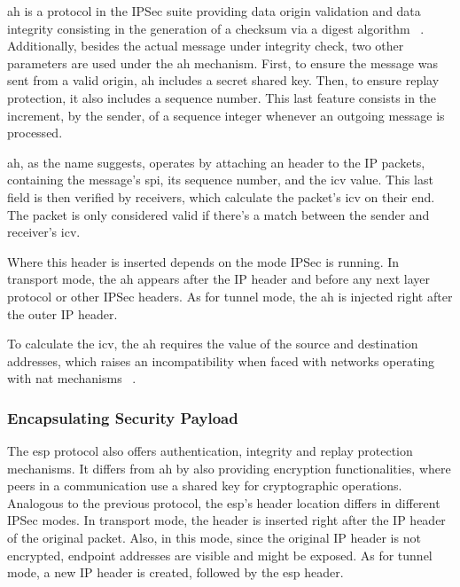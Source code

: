 \documentclass[11pt,twoside,a4paper]{report}
\begin{document}
\acrfull{ah} is a protocol in the IPSec suite providing data origin validation and data integrity consisting in the generation of a checksum via a digest algorithm ~\cite{rfc4302}. Additionally, besides the actual message under integrity check, two other parameters are used under the \acrshort{ah} mechanism. First, to ensure the message was sent from a valid origin, \acrshort{ah} includes a secret shared key. Then, to ensure replay protection, it also includes a sequence number. This last feature consists in the increment, by the sender, of a sequence integer whenever an outgoing message is processed.

\acrshort{ah}, as the name suggests, operates by attaching an header to the IP packets, containing the message's \acrshort{spi}, its sequence number, and the \acrfull{icv} value. This last field is then verified by receivers, which calculate the packet's \acrshort{icv} on their end. The packet is only considered valid if there's a match between the sender and receiver's \acrshort{icv}.

Where this header is inserted depends on the mode IPSec is running. In transport mode, the \acrshort{ah} appears after the IP header and before any next layer protocol or other IPSec headers. As for tunnel mode, the \acrshort{ah} is injected right after the outer IP header.

To calculate the \acrshort{icv}, the \acrshort{ah} requires the value of the source and destination addresses, which raises an incompatibility when faced with networks operating with \acrshort{nat} mechanisms ~\cite{frankel2005guide}.

\subsubsection{Encapsulating Security Payload}

The \acrshort{esp} protocol also offers authentication, integrity and replay protection mechanisms. It differs from \acrshort{ah} by also providing encryption functionalities, where peers in a communication use a shared key for cryptographic operations. Analogous to the previous protocol, the \acrshort{esp}'s header location differs in different IPSec modes. In transport mode, the header is inserted right after the IP header of the original packet. Also, in this mode, since the original IP header is not encrypted, endpoint addresses are visible and might be exposed. As for tunnel mode, a new IP header is created, followed by the \acrshort{esp} header.
\end{document}
